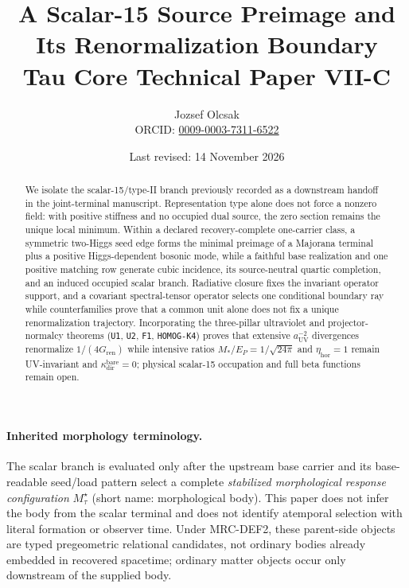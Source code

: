 \documentclass[11pt]{article}
\title{A Scalar-15 Source Preimage and Its Renormalization Boundary\\
\large Tau Core Technical Paper VII-C}
\author{Jozsef Olcsak\\{\small ORCID: \href{https://orcid.org/0009-0003-7311-6522}{0009-0003-7311-6522}}}
\date{Last revised: 14 November 2026}
\begin{document}
\maketitle

\begin{abstract}
We isolate the scalar-15/type-II branch previously recorded as a downstream handoff in the joint-terminal manuscript. Representation type alone does not force a nonzero field: with positive stiffness and no occupied dual source, the zero section remains the unique local minimum. Within a declared recovery-complete one-carrier class, a symmetric two-Higgs seed edge forms the minimal preimage of a Majorana terminal plus a positive Higgs-dependent bosonic mode, while a faithful base realization and one positive matching row generate cubic incidence, its source-neutral quartic completion, and an induced occupied scalar branch. Radiative closure fixes the invariant operator support, and a covariant spectral-tensor operator selects one conditional boundary ray while counterfamilies prove that a common unit alone does not fix a unique renormalization trajectory. Incorporating the three-pillar ultraviolet and projector-normalcy theorems (\texttt{U1}, \texttt{U2}, \texttt{F1}, \texttt{HOMOG-K4}) proves that extensive \(a_{\mathrm{UV}}^{-2}\) divergences renormalize \(1/(4G_{\mathrm{ren}})\) while intensive ratios \(M_*/E_P=1/\sqrt{24\pi}\) and \(\eta_{\mathrm{hor}}=1\) remain UV-invariant and \(\kappa_{\mathrm{dir}}^{\mathrm{bare}}=0\); physical scalar-15 occupation and full beta functions remain open.
\end{abstract}

\paragraph{Inherited morphology terminology.}
The scalar branch is evaluated only after the upstream base carrier and its
base-readable seed/load pattern select a complete \emph{stabilized
morphological response configuration} $M_\tau^\star$ (short name:
morphological body).  This paper does not infer the body from the scalar
terminal and does not identify atemporal selection with literal formation or
observer time.
Under MRC-DEF2, these parent-side objects are typed pregeometric relational
candidates, not ordinary bodies already embedded in recovered spacetime;
ordinary matter objects occur only downstream of the supplied body.
\end{document}
